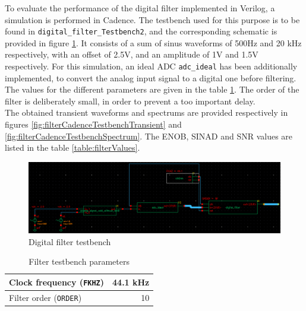 To evaluate the performance of the digital filter implemented in Verilog, a simulation is performed in Cadence. The testbench used for this purpose is to be found in \texttt{digital\_filter\_Testbench2}, and the corresponding schematic is provided in figure \ref{fig:filterTestbench}. It consists of a sum of sinus waveforms of 500Hz and 20 kHz respectively, with an offset of 2.5V, and an amplitude of 1V and 1.5V respectively. For this simulation, an ideal ADC \texttt{adc\_ideal} has been additionally implemented, to convert the analog input signal to a digital one before filtering. The values for the different parameters are given in the table \ref{table:filterTestbench}. The order of the filter is deliberately small, in order to prevent a too important delay.\\
The obtained transient waveforms and spectrums are provided respectively in figures \ref{fig:filterCadenceTestbenchTransient} and \ref{fig:filterCadenceTestbenchSpectrum}. The ENOB, SINAD and SNR values are listed in the table \ref{table:filterValues}.
 

\begin{figure}[!h]
	\centering 
	\includegraphics[scale=0.55]{images/Filter/testbench.png}
	\caption{Digital filter testbench}
	\label{fig:filterTestbench}
\end{figure} 

\begin{table}[!h]
	\centering
	\begin{tabular}{|l|r|}
		\hline
		Clock frequency (\texttt{FKHZ}) & 44.1 kHz \\
		\hline
		Filter order (\texttt{ORDER}) & 10 \\
		\hline
	\end{tabular}
	\caption{Filter testbench parameters}
	\label{table:filterTestbench}
\end{table}


